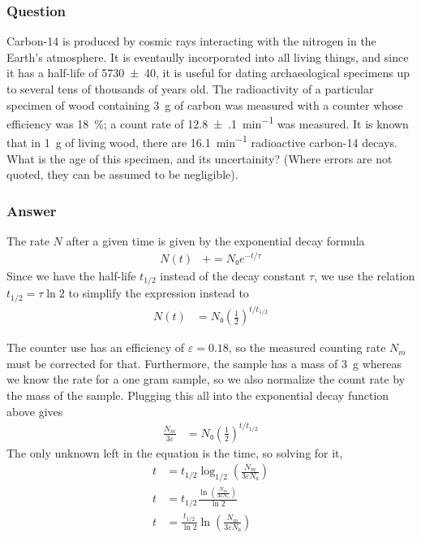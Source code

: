 \subsubsection{Question}

Carbon-14 is produced by cosmic rays interacting with the nitrogen in the
Earth's atmosphere. It is eventaully incorporated into all living things,
and since it has a half-life of \SI{5730(40)}{\year}, it is useful for
dating archaeological specimens up to several tens of thousands of years
old. The radioactivity of a particular specimen of wood containing \SI{3}{\g}
of carbon was measured with a counter whose efficiency was
\SI{18}{\percent}; a count rate of \SI{12.8(1)}{\minute^{-1}} was measured.
It is known that in \SI{1}{\g} of living wood, there are
\SI{16.1}{\minute^{-1}} radioactive carbon-14 decays. What is the age of
this specimen, and its uncertainity? (Where errors are not quoted, they can
be assumed to be negligible).

\subsubsection{Answer}
The rate $N$ after a given time is given by the exponential decay formula
\begin{align*}
    N(t) &+= N₀ e^{-t/τ}
\end{align*}
Since we have the half-life $t_{1/2}$ instead of the decay constant $τ$, we
use the relation $t_{1/2} = τ\ln 2$ to simplify the expression instead to
\begin{align*}
    N(t) &= N₀ (\frac 12)^{t/t_{1/2}}
\end{align*}

The counter use has an efficiency of $ε = 0.18$, so the measured counting
rate $N_m$ must be corrected for that. Furthermore, the sample has a mass of
\SI{3}{\g} whereas we know the rate for a one gram sample, so we also
normalize the count rate by the mass of the sample. Plugging this all into
the exponential decay function above gives
\begin{align*}
    \frac{N_m}{3ε} &= N₀ (\frac 12)^{t/t_{1/2}}
\end{align*}
The only unknown left in the equation is the time, so solving for it,
\begin{align*}
    t &= t_{1/2} \log_{1/2} (\frac{N_m}{3εN₀}) \\
    t &= t_{1/2} \frac{\ln (\frac{N_m}{3εN₀})}{\ln 2} \\
    t &= \frac{t_{1/2}}{\ln 2} \ln (\frac{N_m}{3εN₀})
\end{align*}

